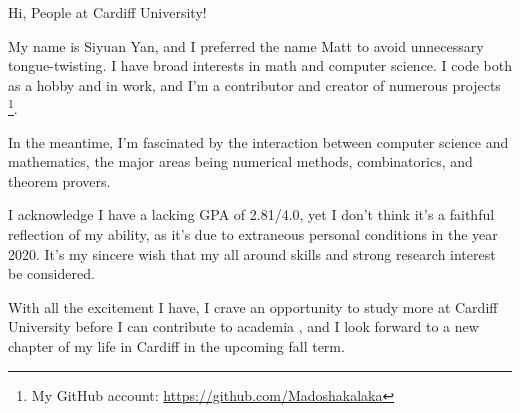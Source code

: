 \documentclass[11pt]{article}
\begin{document}
    Hi, People at Cardiff University!

    My name is Siyuan Yan,
    and I preferred the name Matt to avoid unnecessary tongue-twisting.
    I have broad interests in math and computer science.
    I code both as a hobby and in work, and I'm a contributor and creator of numerous projects
    \footnote{My GitHub account: \url{https://github.com/Madoshakalaka}}.

    In the meantime, I'm fascinated by the interaction between computer science and mathematics,
    the major areas being numerical methods, combinatorics, and theorem provers.

    I acknowledge I have a lacking GPA of 2.81/4.0, yet I don't think it's a faithful reflection of my ability,
    as it's due to extraneous personal conditions in the year 2020.
    It's my sincere wish that my all around skills and strong research interest be considered.

    

    

    

    With all the excitement I have,
    I crave an opportunity to study more at Cardiff University before I can contribute to academia
    , and I look forward to a new chapter of my life in Cardiff in the upcoming fall term.


    
\end{document}

